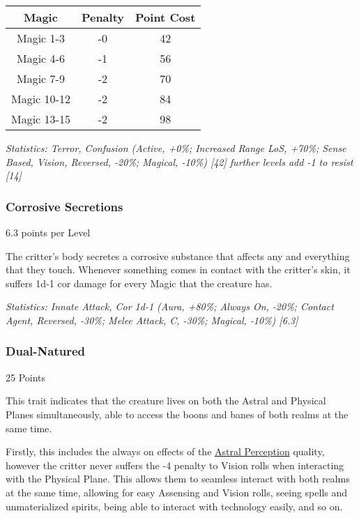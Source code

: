 \begin{multicols*}{3}
	\begin{center}
		\begin{tabular}{|c|c|c|}
			\hline
			Magic & Penalty & Point Cost\\
			\hline
			\hline
			Magic 1-3 & -0 & 42 \\
			Magic 4-6 & -1 & 56 \\
			Magic 7-9 & -2 & 70 \\
			Magic 10-12 & -2 & 84 \\
			Magic 13-15 & -2 & 98 \\
			\hline
		\end{tabular}
	\end{center}
	
	\textcolor{OliveGreen}{\textit{Statistics: Terror, Confusion (Active, +0\%; Increased Range LoS, +70\%; Sense Based, Vision, Reversed, -20\%; Magical, -10\%) [42] further levels add -1 to resist [14]
	}}

	\subsubsection{Corrosive Secretions}\label{corrosive_secretions}
	\begin{flushright}
		6.3 points per Level
	\end{flushright}

	The critter's body secretes a corrosive substance that affects any and everything that they touch. Whenever something comes in contact with the critter's skin, it suffers 1d-1 cor damage for every Magic that the creature has.

	\textcolor{OliveGreen}{\textit{Statistics:  Innate Attack, Cor 1d-1 (Aura, +80\%; Always On, -20\%; Contact Agent, Reversed, -30\%; Melee Attack, C, -30\%; Magical, -10\%) [6.3] }}


	\subsubsection{Dual-Natured}\label{dual_natured}
	\begin{flushright}
		25 Points
	\end{flushright}

	This trait indicates that the creature lives on both the Astral and Physical Planes simultaneously, able to access the boons and banes of both realms at the same time.
	
	Firstly, this includes the always on effects of the \hyperref[astral_perception]{Astral Perception} quality, however the critter never suffers the -4 penalty to Vision rolls when interacting with the Physical Plane. This allows them to seamless interact with both realms at the same time, allowing for easy Assensing and Vision rolls, seeing spells and unmaterialized spirits, being able to interact with technology easily, and so on.
	

\end{multicols*}
